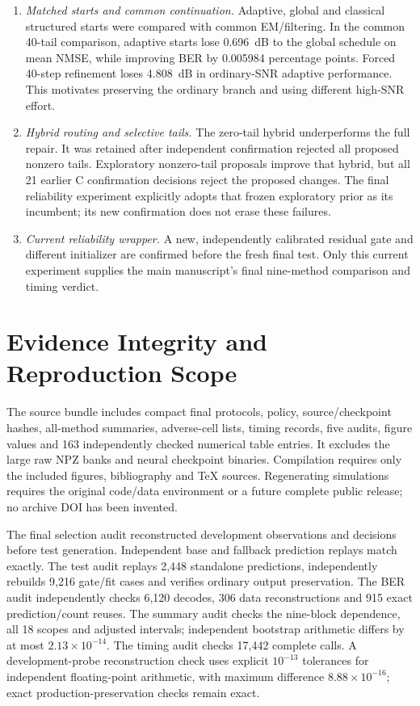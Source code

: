 \begin{enumerate}
\item \emph{Matched starts and common continuation.} Adaptive, global and classical structured starts were compared with common EM/filtering. In the common 40-tail comparison, adaptive starts lose 0.696~dB to the global schedule on mean NMSE, while improving BER by 0.005984 percentage points. Forced 40-step refinement loses 4.808~dB in ordinary-SNR adaptive performance. This motivates preserving the ordinary branch and using different high-SNR effort.
\item \emph{Hybrid routing and selective tails.} The zero-tail hybrid underperforms the full repair. It was retained after independent confirmation rejected all proposed nonzero tails. Exploratory nonzero-tail proposals improve that hybrid, but all 21 earlier C confirmation decisions reject the proposed changes. The final reliability experiment explicitly adopts that frozen exploratory prior as its incumbent; its new confirmation does not erase these failures.
\item \emph{Current reliability wrapper.} A new, independently calibrated residual gate and different initializer are confirmed before the fresh final test. Only this current experiment supplies the main manuscript's final nine-method comparison and timing verdict.
\end{enumerate}

\section{Evidence Integrity and Reproduction Scope}
The source bundle includes compact final protocols, policy, source/checkpoint hashes, all-method summaries, adverse-cell lists, timing records, five audits, figure values and 163 independently checked numerical table entries. It excludes the large raw NPZ banks and neural checkpoint binaries. Compilation requires only the included figures, bibliography and TeX sources. Regenerating simulations requires the original code/data environment or a future complete public release; no archive DOI has been invented.

The final selection audit reconstructed development observations and decisions before test generation. Independent base and fallback prediction replays match exactly. The test audit replays 2,448 standalone predictions, independently rebuilds 9,216 gate/fit cases and verifies ordinary output preservation. The BER audit independently checks 6,120 decodes, 306 data reconstructions and 915 exact prediction/count reuses. The summary audit checks the nine-block dependence, all 18 scopes and adjusted intervals; independent bootstrap arithmetic differs by at most $2.13\times10^{-14}$. The timing audit checks 17,442 complete calls. A development-probe reconstruction check uses explicit $10^{-13}$ tolerances for independent floating-point arithmetic, with maximum difference $8.88\times10^{-16}$; exact production-preservation checks remain exact.

